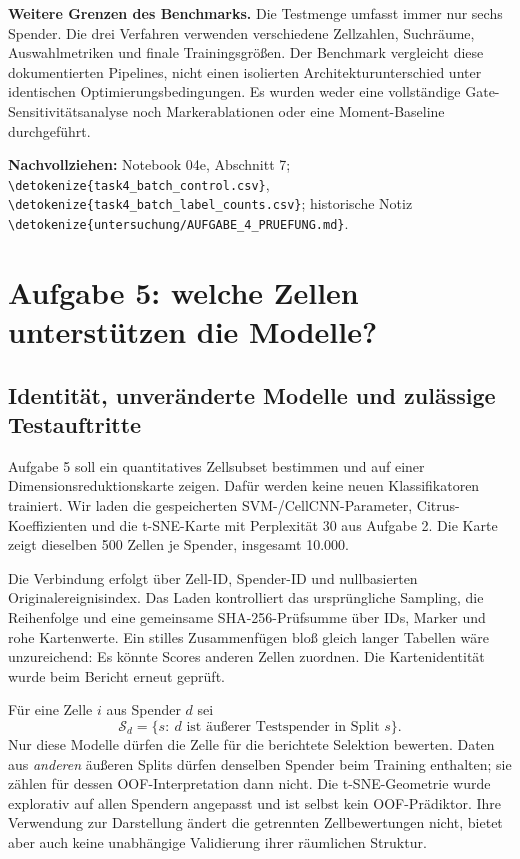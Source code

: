 \documentclass[11pt,a4paper]{article}
\newcommand{\code}[1]{\expandafter\nolinkurl\expandafter{\detokenize{#1}}}
\newcommand{\source}[1]{\par{\footnotesize\raggedright\color{muted}\textbf{Nachvollziehen:} #1\par}}
\begin{document}
\textbf{Weitere Grenzen des Benchmarks.} Die Testmenge umfasst immer nur
sechs Spender. Die drei Verfahren verwenden verschiedene Zellzahlen,
Suchräume, Auswahlmetriken und finale Trainingsgrößen. Der Benchmark
vergleicht diese dokumentierten Pipelines, nicht einen isolierten
Architekturunterschied unter identischen Optimierungsbedingungen.
Es wurden weder eine vollständige Gate-Sensitivitätsanalyse noch
Markerablationen oder eine Moment-Baseline durchgeführt.
\source{Notebook 04e, Abschnitt 7; \code{task4_batch_control.csv},
\code{task4_batch_label_counts.csv}; historische Notiz
\code{untersuchung/AUFGABE_4_PRUEFUNG.md}.}

\clearpage
\section{Aufgabe 5: welche Zellen unterstützen die Modelle?}\label{sec:task5}
\subsection*{Identität, unveränderte Modelle und zulässige Testauftritte}
Aufgabe 5 soll ein quantitatives Zellsubset bestimmen und auf einer
Dimensionsreduktionskarte zeigen. Dafür werden keine neuen Klassifikatoren
trainiert. Wir laden die gespeicherten SVM-/CellCNN-Parameter,
Citrus-Koeffizienten und die t-SNE-Karte mit Perplexität 30 aus Aufgabe 2.
Die Karte zeigt dieselben 500 Zellen je Spender, insgesamt 10.000.

Die Verbindung erfolgt über Zell-ID, Spender-ID und nullbasierten
Originalereignisindex. Das Laden kontrolliert das ursprüngliche Sampling,
die Reihenfolge und eine gemeinsame SHA-256-Prüfsumme über IDs, Marker
und rohe Kartenwerte. Ein stilles Zusammenfügen bloß gleich langer
Tabellen wäre unzureichend: Es könnte Scores anderen Zellen zuordnen.
Die Kartenidentität wurde beim Bericht erneut geprüft.

Für eine Zelle \(i\) aus Spender \(d\) sei
\[
 \mathcal S_d=\{s:\ d\text{ ist äußerer Testspender in Split }s\}.
\]
Nur diese Modelle dürfen die Zelle für die berichtete Selektion bewerten.
Daten aus \emph{anderen} äußeren Splits dürfen denselben Spender beim
Training enthalten; sie zählen für dessen OOF-Interpretation dann nicht.
Die t-SNE-Geometrie wurde explorativ auf allen Spendern angepasst und ist
selbst kein OOF-Prädiktor. Ihre Verwendung zur Darstellung ändert die
getrennten Zellbewertungen nicht, bietet aber auch keine unabhängige
Validierung ihrer räumlichen Struktur.
\end{document}

